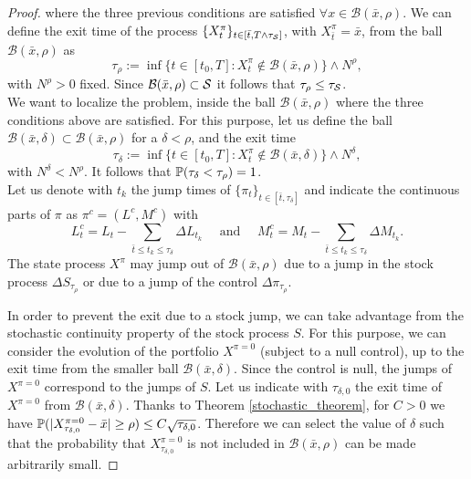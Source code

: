 \begin{proof}
where the three previous conditions are satisfied $\forall x \in \mathcal{B}(\bar x, \rho)$. 
We can define the exit time of the process $\{X^{\pi}_t\}_{t \in [\bar t, T\wedge \tau_{\mathcal{S}}]}$, with $X^{\pi}_{\bar t} = \bar x$, from the ball $\mathcal{B}(\bar x, \rho)$ as
\begin{equation}
 \tau_{\rho} := \inf \{ t \in [t_0,T] : X^{\pi}_t \not \in \mathcal{B}(\bar x, \rho) \} \wedge N^{\rho},
\end{equation}
with $N^{\rho}>0$ fixed.
Since $\mathcal{B}(\bar x, \rho) \subset \mathcal{S}$ it follows that $\tau_{\rho} \leq \tau_{\mathcal{S}}$.\\
We want to localize the problem, inside the ball $\mathcal{B}(\bar x, \rho) $ where the three conditions above are satisfied.
For this purpose, let us define the ball $\mathcal{B}(\bar x, \delta) \subset \mathcal{B}(\bar x, \rho) $ for a $\delta < \rho$,
and the exit time
\begin{equation}
 \tau_{\delta} := \inf \{ t \in [t_0,T] : X^{\pi}_t \not \in \mathcal{B}(\bar x, \delta) \} \wedge N^{\delta},
\end{equation}
with $N^{\delta} < N^{\rho}$. It follows that $\mathbb{P}(\tau_{\delta} < \tau_{\rho}) = 1$. \\
Let us denote with $t_k$ the jump times of $\{\pi_t\}_{t \in [\bar t, \tau_{\delta}]}$ and indicate the continuous parts of $\pi$ as 
$\pi^c = (L^c, M^c)$ with
\begin{equation}
 L^c_t = L_t - \sum_{\bar t \leq t_k \leq \tau_{\delta}} \Delta L_{t_k} \quad \mbox{ and } \quad  M^c_t = M_t - \sum_{\bar t \leq t_k \leq \tau_{\delta}} \Delta M_{t_k}.
\end{equation}
The state process $X^{\pi}$ may jump out of $ \mathcal{B}(\bar x, \rho) $
due to a jump in the stock process $\Delta S_{\tau_{\rho}}$ or due to a jump of the control $\Delta \pi_{\tau_{\rho}}$.

In order to prevent the exit due to a stock jump, we can take advantage from the stochastic continuity property of the stock process $S$. 
For this purpose, we can 
consider the evolution of the portfolio $X^{\pi=0}$ (subject to a null control), up to the exit time from the smaller ball $ \mathcal{B}(\bar x, \delta) $. 
Since the control is null, the jumps of $X^{\pi=0}$ correspond to the jumps of $S$.
Let us indicate with $\tau_{\delta,0}$ the exit time of $X^{\pi=0}$ from $ \mathcal{B}(\bar x, \delta) $.
Thanks to Theorem \ref{stochastic_theorem}, for $C>0$ we have $\mathbb{P}( |X^{\pi=0}_{\tau_{\delta,0}} - \bar x| \geq \rho ) \leq C \sqrt{\tau_{\delta,0}}$. 
Therefore we can select the value of $\delta$ such that the probability that $X^{\pi=0}_{\tau_{\delta,0}}$ is not included in $ \mathcal{B}(\bar x, \rho) $ 
can be made arbitrarily small.


\end{proof}
